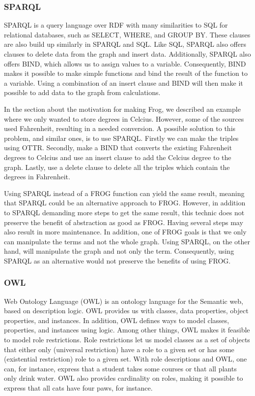 \subsubsection{SPARQL}
SPARQL is a query language over RDF with many similarities to SQL for relational databases, such as SELECT, WHERE, and GROUP BY. These clauses are also build up similarly in SPARQL and SQL.  Like SQL, SPARQL also offers clauses to delete data from the graph and insert data. Additionally, SPARQL also offers BIND, which allows us to assign values to a variable. Consequently, BIND makes it possible to make simple functions and bind the result of the function to a variable. Using a combination of an insert clause and BIND will then make it possible to add data to the graph from calculations.

\para
In the section about the motivation for making Frog, we described an example where we only wanted to store degrees in Celcius. However, some of the sources used Fahrenheit, resulting in a needed conversion. A possible solution to this problem, and similar ones, is to use SPARQL. Firstly we can make the triples using OTTR. Secondly, make a BIND that converts the existing Fahrenheit degrees to Celcius and use an insert clause to add the Celcius degree to the graph. Lastly, use a delete clause to delete all the triples which contain the degrees in Fahrenheit.

\para
Using SPARQL instead of a FROG function can yield the same result, meaning that SPARQL could be an alternative approach to FROG. However, in addition to SPARQL demanding more steps to get the same result, this technic does not preserve the benefit of abstraction as good as FROG. Having several steps may also result in more maintenance. In addition, one of FROG goals is that we only can manipulate the terms and not the whole graph. Using SPARQL, on the other hand, will manipulate the graph and not only the term. Consequently, using SPARQL as an alternative would not preserve the benefits of using FROG.   


\subsubsection{OWL}
Web Ontology Language (OWL) is an ontology language for the Semantic web, based on description logic. OWL provides us with classes, data properties, object properties, and instances. In addition, OWL defines ways to model classes, properties, and instances using logic. Among other things, OWL makes it feasible to model role restrictions. Role restrictions let us model classes as a set of objects that either only (universal restriction) have a role to a given set or has some (existential restriction) role to a given set.  With role descriptions and OWL, one can, for instance, express that a student takes some courses or that all plants only drink water. OWL also provides cardinality on roles, making it possible to express that all cats have four paws, for instance.

